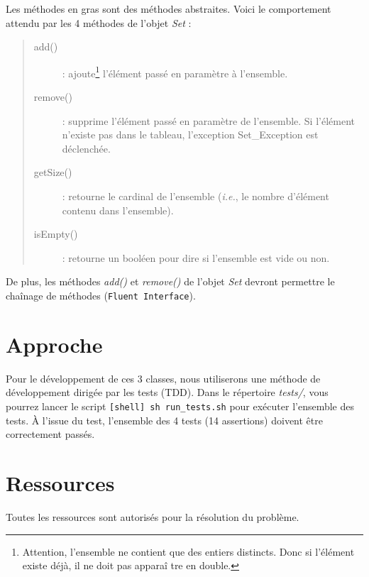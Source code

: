 \documentclass[a4paper]{scrartcl}
\begin{document}
Les méthodes en gras sont des méthodes abstraites. Voici le comportement attendu par les 4 méthodes de l'objet
\emph{Set} :

\begin{quote}
\begin{description}
\item[add()] : ajoute\footnote{Attention, l'ensemble ne contient que des entiers distincts. Donc si l'élément existe déjà, 
	il ne doit pas appara\^i tre en double.} l'élément passé en paramètre à l'ensemble.
\item[remove()] : supprime l'élément passé en paramètre de l'ensemble. Si l'élément n'existe pas dans le tableau, 
	l'exception Set\_Exception est déclenchée.
\item[getSize()] : retourne le cardinal de l'ensemble (\emph{i.e.}, le nombre d'élément contenu dans l'ensemble).
\item[isEmpty()] : retourne un booléen pour dire si l'ensemble est vide ou non.
\end{description}
\end{quote}

De plus, les méthodes \emph{add()} et \emph{remove()} de l'objet \emph{Set} devront permettre le cha\^inage de méthodes (\verb!Fluent Interface!).

\section{Approche}

Pour le développement de ces 3 classes, nous utiliserons une méthode de développement dirigée par les tests (TDD). Dans le 
répertoire \emph{tests/}, vous pourrez lancer le script \verb![shell] sh run_tests.sh! pour exécuter l'ensemble des tests. 
À l'issue du test, l'ensemble des 4 tests (14 assertions) doivent \^etre correctement passés.

\section{Ressources}

Toutes les ressources sont autorisés pour la résolution du problème.
\end{document}
